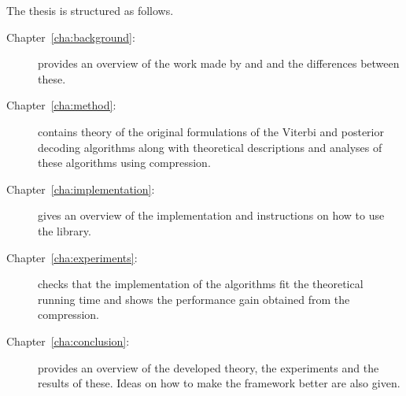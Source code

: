 The thesis is structured as follows.
\begin{description}
\item[Chapter~\ref{cha:background}: ] provides an
  overview of the work made by \citet{lifshits2009speeding} and
  \citet{sand2013ziphmmlib} and the differences between these.
\item[Chapter~\ref{cha:method}: ] contains theory of the
  original formulations of the Viterbi and posterior decoding algorithms along
  with theoretical descriptions and analyses of these algorithms using
  compression.
\item[Chapter~\ref{cha:implementation}: ] gives an
  overview of the implementation and instructions on how to use the library.
\item[Chapter~\ref{cha:experiments}: ] checks that the
  implementation of the algorithms fit the theoretical running time and shows
  the performance gain obtained from the compression.
\item[Chapter~\ref{cha:conclusion}: ] provides an
  overview of the developed theory, the experiments and the results of these.
  Ideas on how to make the framework better are also given.
\end{description}

